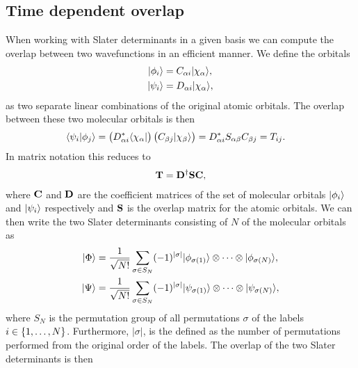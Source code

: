     \subsection{Time dependent overlap}
        When working with Slater determinants in a given basis we can compute
        the overlap between two wavefunctions in an efficient manner. We define
        the orbitals
        \begin{align}
            | \phi_i \rangle &= C_{\alpha i}| \chi_{\alpha} \rangle, \\
            | \psi_i \rangle &= D_{\alpha i}| \chi_{\alpha} \rangle,
        \end{align}
        as two separate linear combinations of the original atomic orbitals. The
        overlap between these two molecular orbitals is then
        \begin{align}
            \langle \psi_i | \phi_j \rangle
            &= \left( 
                D_{\alpha i}^{*}
                \langle \chi_{\alpha} |
             \right)\left( 
                C_{\beta j}
                | \chi_{\beta} \rangle
             \right)
            = D_{\alpha i}^{*}S_{\alpha\beta} C_{\beta j}
            = T_{ij}.
        \end{align}
        In matrix notation this reduces to
        \begin{align}
            \mathbf{T} = \mathbf{D}^{\dagger}\mathbf{S}\mathbf{C},
        \end{align}
        where $\mathbf{C}$ and $\mathbf{D}$ are the coefficient matrices of the set of
        molecular orbitals $| \phi_i \rangle$ and $| \psi_i \rangle$ respectively and
        $\mathbf{S}$ is the overlap matrix for the atomic orbitals.  We can then
        write the two Slater determinants consisting of $N$ of the molecular
        orbitals as
        \begin{align}
            | \Phi \rangle &= \frac{1}{\sqrt{N!}}
            \sum_{\sigma \in S_N}(-1)^{|\sigma|}
            | \phi_{\sigma(1)} \rangle
            \otimes\dots\otimes
            | \phi_{\sigma(N)} \rangle, \\
            | \Psi \rangle &= \frac{1}{\sqrt{N!}}
            \sum_{\sigma \in S_N}(-1)^{|\sigma|}
            | \psi_{\sigma(1)} \rangle
            \otimes\dots\otimes
            | \psi_{\sigma(N)} \rangle,
        \end{align}
        where $S_N$ is the permutation group of all permutations $\sigma$ of the
        labels $i \in \left\{ 1, \dots, N \right\}$. Furthermore, $|\sigma|$, is the
        defined as the number of permutations performed from the original order
        of the labels. The overlap of the two Slater determinants is then
